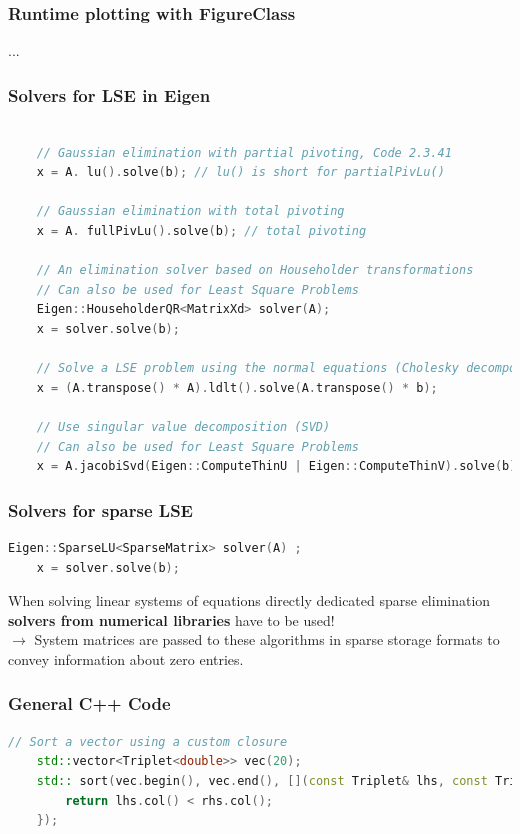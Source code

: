 \documentclass[12pt, a4paper]{article}
\begin{document}
\subsubsection{Runtime plotting with FigureClass}
...

\subsubsection{Solvers for LSE in Eigen }
	\begin{lstlisting}[language=C++]
	
	// Gaussian elimination with partial pivoting, Code 2.3.41
	x = A. lu().solve(b); // lu() is short for partialPivLu()
	
	// Gaussian elimination with total pivoting
	x = A. fullPivLu().solve(b); // total pivoting
	
	// An elimination solver based on Householder transformations
	// Can also be used for Least Square Problems	
	Eigen::HouseholderQR<MatrixXd> solver(A);
	x = solver.solve(b);	
	
	// Solve a LSE problem using the normal equations (Cholesky decomposition)
	x = (A.transpose() * A).ldlt().solve(A.transpose() * b);
	
	// Use singular value decomposition (SVD)
	// Can also be used for Least Square Problems	
	x = A.jacobiSvd(Eigen::ComputeThinU | Eigen::ComputeThinV).solve(b);	
\end{lstlisting}


\subsubsection{Solvers for sparse LSE}
\begin{lstlisting}[language=C++]
	Eigen::SparseLU<SparseMatrix> solver(A) ;
	x = solver.solve(b);
\end{lstlisting}

\begin{tcolorbox}
	When solving linear systems of equations directly dedicated sparse elimination \textbf{solvers from numerical libraries} have to be used! \\
	
	$\rightarrow$ System matrices are passed to these algorithms in sparse storage formats to convey information about zero entries.	
\end{tcolorbox}


\subsubsection{General C++ Code}
\begin{lstlisting}[language=C++]
	// Sort a vector using a custom closure
	std::vector<Triplet<double>> vec(20);
	std:: sort(vec.begin(), vec.end(), [](const Triplet& lhs, const Triplet& rhs) {
		return lhs.col() < rhs.col(); 
	});
\end{lstlisting}
\end{document}
